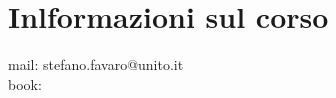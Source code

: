 \chapter*{Inlformazioni sul corso} %
\label{sommario}
\vspace{15pt}

mail: stefano.favaro@unito.it\\
book: \cite{Casella}

\clearpage


